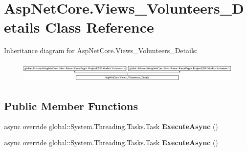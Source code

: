 \hypertarget{class_asp_net_core_1_1_views___volunteers___details}{}\section{Asp\+Net\+Core.\+Views\+\_\+\+Volunteers\+\_\+\+Details Class Reference}
\label{class_asp_net_core_1_1_views___volunteers___details}
Inheritance diagram for Asp\+Net\+Core.\+Views\+\_\+\+Volunteers\+\_\+\+Details\+:\begin{figure}[H]
\begin{center}
\leavevmode
\includegraphics[height=1.087379cm]{class_asp_net_core_1_1_views___volunteers___details}
\end{center}
\end{figure}
\subsection*{Public Member Functions}
\begin{DoxyCompactItemize}
\item 
\mbox{\label{class_asp_net_core_1_1_views___volunteers___details_af42745522210db158818f3542f6d8e2e}} 
async override global\+::\+System.\+Threading.\+Tasks.\+Task {\bfseries Execute\+Async} ()
\item 
\mbox{\label{class_asp_net_core_1_1_views___volunteers___details_af42745522210db158818f3542f6d8e2e}} 
async override global\+::\+System.\+Threading.\+Tasks.\+Task {\bfseries Execute\+Async} ()
\end{DoxyCompactItemize}
